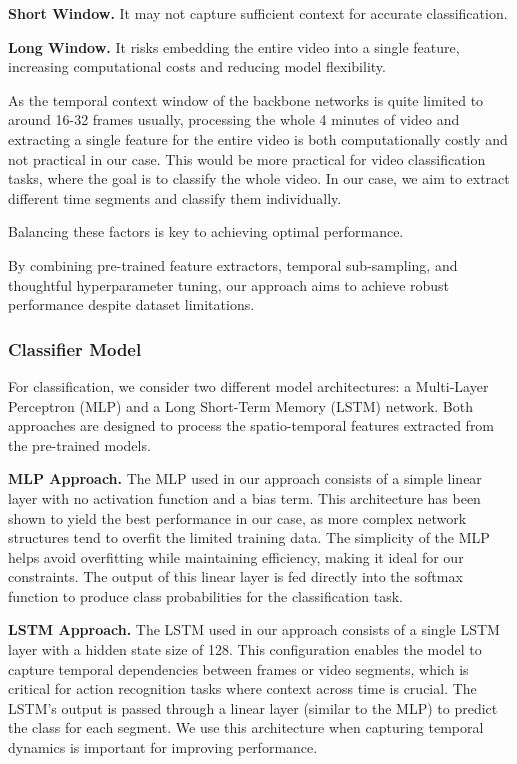 \noindent\textbf{\small{Short Window.}}
It may not capture sufficient context for accurate classification.

\noindent\textbf{\small{Long Window.}}
It risks embedding the entire video into a single feature, increasing computational costs and reducing model flexibility.

As the temporal context window of the backbone networks is quite limited to around 16-32 frames usually, processing the whole 4 minutes of video and extracting a single feature for the entire video is both computationally costly and not practical in our case. This would be more practical for video classification tasks, where the goal is to classify the whole video. In our case, we aim to extract different time segments and classify them individually.

Balancing these factors is key to achieving optimal performance.

By combining pre-trained feature extractors, temporal sub-sampling, and thoughtful hyperparameter tuning, our approach aims to achieve robust performance despite dataset limitations.

\subsubsection*{Classifier Model}

For classification, we consider two different model architectures: a Multi-Layer Perceptron (MLP) and a Long Short-Term Memory (LSTM) network. Both approaches are designed to process the spatio-temporal features extracted from the pre-trained models.

\noindent\textbf{MLP Approach.} The MLP used in our approach consists of a simple linear layer with no activation function and a bias term. This architecture has been shown to yield the best performance in our case, as more complex network structures tend to overfit the limited training data. The simplicity of the MLP helps avoid overfitting while maintaining efficiency, making it ideal for our constraints. The output of this linear layer is fed directly into the softmax function to produce class probabilities for the classification task.

\noindent\textbf{LSTM Approach.} The LSTM used in our approach consists of a single LSTM layer with a hidden state size of 128. This configuration enables the model to capture temporal dependencies between frames or video segments, which is critical for action recognition tasks where context across time is crucial. The LSTM’s output is passed through a linear layer (similar to the MLP) to predict the class for each segment. We use this architecture when capturing temporal dynamics is important for improving performance.

